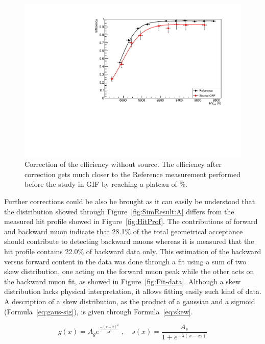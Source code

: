 	\begin{figure}[H]
            \centering
		\includegraphics[width = \plotwidth]{fig/chapt5/Compared-Efficiency-Correction.pdf}
		\caption{\label{fig:EffCorrection} Correction of the efficiency without source. The efficiency after correction gets much closer to the Reference measurement performed before the study in GIF by reaching a plateau of \%.}
	\end{figure}
	
	Further corrections could be also be brought as it can easily be understood that the distribution showed through Figure~\ref{fig:SimResult:A} differs from the measured hit profile showed in Figure~\ref{fig:HitProf}. The contributions of forward and backward muon indicate that 28.1\% of the total geometrical acceptance should contribute to detecting backward muons whereas it is measured that the hit profile contains 22.0\% of backward data only. This estimation of the backward versus forward content in the data was done through a fit using a sum of two skew distribution, one acting on the forward muon peak while the other acts on the backward muon fit, as showed in Figure~\ref{fig:Fit-data}. Although a skew distribution lacks physical interpretation, it allows fitting easily such kind of data. A description of a skew distribution, as the product of a gaussian and a sigmoid (Formula~\ref{eq:gaus-sig}), is given through Formula~\ref{eq:skew}.
	
	\begin{equation}
	\label{eq:gaus-sig}
	g(x) = A_g e^{\frac{-(x-\bar{x})^2}{2\sigma^2}}\; , \quad s(x) = \frac{A_s}{1+e^{-\lambda(x-x_i)}}
	\end{equation}
	
